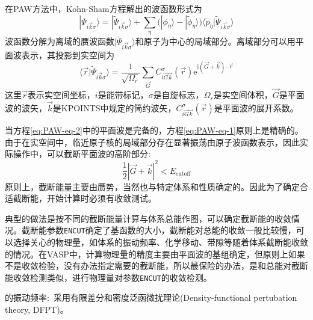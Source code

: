 在\textrm{PAW}方法中，\textrm{Kohn-Sham}方程解出的波函数形式为
\begin{equation}
	|\Psi_{i\vec k\sigma}\rangle=|\tilde{\Psi}_{i\vec k\sigma}\rangle+\sum_{\eta}\bigg(|\phi_{\eta}\rangle-|\tilde\phi_{\eta}\rangle\bigg)\langle\tilde p_{\eta}|\tilde\Psi_{i\vec k\sigma}\rangle
	\label{eq:PAW-eq-1}
\end{equation}
波函数分解为离域的赝波函数$|\tilde{\Psi}_{i\vec k\sigma}\rangle$和原子为中心的局域部分。离域部分可以用平面波表示，其投影到实空间为
\begin{equation}
	\langle\vec r|\tilde{\Psi}_{i\vec k\sigma}\rangle=\dfrac1{\sqrt{\Omega_r}}\sum_{\vec G}C_{i\vec G\vec k}^{\sigma}(\vec r)\mathrm{e}^{\mathrm{i}(\vec G+\vec k)\cdot\vec r}
	\label{eq:PAW-eq-2}
\end{equation}
这里$\vec r$表示实空间坐标，$i$是能带标记，$\sigma$是自旋标志，$\Omega_r$是实空间体积，$\vec G$是平面波的波矢，$\vec k$是\textrm{KPOINTS}中规定的简约波矢，$C_{i\vec G\vec k}^{\sigma}(\vec r)$是平面波的展开系数。

当方程\eqref{eq:PAW-eq-2}中的平面波是完备的，方程\eqref{eq:PAW-eq-1}原则上是精确的。由于在实空间中，临近原子核的局域部分存在显著振荡由原子波函数表示，因此实际操作中，可以截断平面波的高阶部分:
\begin{displaymath}
	\dfrac12|\vec G+\vec k|^2<E_{\mathrm{cutoff}}
\end{displaymath}
原则上，截断能量主要由赝势，当然也与特定体系和性质确定的。因此为了确定合适截断能，开始计算时必须有收敛测试。

典型的做法是按不同的截断能量计算与体系总能作图，可以确定截断能的收敛情况。截断能参数\texttt{ENCUT}确定了基函数的大小，截断能对总能的收敛一般比较慢，可以选择关心的物理量，如体系的振动频率、化学移动、带隙等随着体系截断能收敛的情况。在\textrm{VASP}中，计算物理量的精度主要由平面波的基组确定，但原则上如果不是收敛检验，没有办法指定需要的截断能，所以最保险的办法，是和总能对截断能收敛检测类似，进行物理量对参数\texttt{ENCUT}的收敛检测。

的振动频率:~采用有限差分和密度泛函微扰理论\textrm{(Density-functional pertubation theory, DFPT)}。

